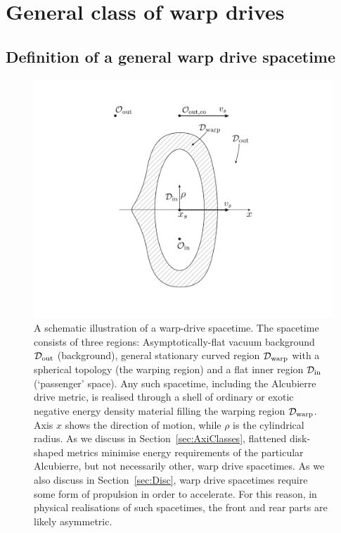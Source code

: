 \documentclass[10pt]{iopart}
\begin{document}
\section{General class of warp drives}
\label{sec:GenDrives}
\subsection{Definition of a general warp drive spacetime}


\begin{figure}
\begin{center}
    \includegraphics[width=\linewidth]{./WarpSketchFinal2.png}
\end{center}
\begin{flushleft}
    \caption{A schematic illustration of a warp-drive spacetime. The spacetime consists of three regions: Asymptotically-flat vacuum background $\mathcal{D}_{\rm out}$ (background), general stationary curved region $\mathcal{D}_{\rm warp}$ with a spherical topology (the warping region) and a flat inner region $\mathcal{D}_{\rm in}$ (`passenger' space). Any such spacetime, including the Alcubierre drive metric, is realised through a shell of ordinary or exotic negative energy density material filling the warping region $\mathcal{D}_{\rm warp}$. Axis $x$ shows the direction of motion, while $\rho$ is the cylindrical radius. As we discuss in Section~\ref{sec:AxiClasses}, flattened disk-shaped metrics minimise energy requirements of the particular Alcubierre, but not necessarily other, warp drive spacetimes. As we also discuss in Section~\ref{sec:Disc}, warp drive spacetimes require some form of propulsion in order to accelerate. For this reason, in physical realisations of such spacetimes, the front and rear parts are likely asymmetric. \label{fig:DriveScheme}}
\end{flushleft}    
\end{figure}
\end{document}
